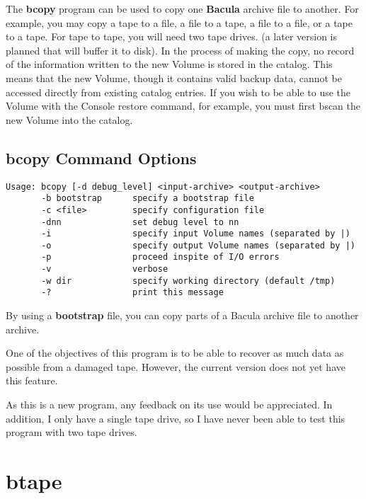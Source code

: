 The {\bf bcopy} program can be used to copy one {\bf Bacula} archive file to
another. For example, you may copy a tape to a file, a file to a tape, a file
to a file, or a tape to a tape. For tape to tape, you will need two tape
drives. (a later version is planned that will buffer it to disk). In the
process of making the copy, no record of the information written to the new
Volume is stored in the catalog. This means that the new Volume, though it
contains valid backup data, cannot be accessed directly from existing catalog
entries. If you wish to be able to use the Volume with the Console restore
command, for example, you must first bscan the new Volume into the catalog.

\subsection{bcopy Command Options}

\footnotesize
\begin{verbatim}
Usage: bcopy [-d debug_level] <input-archive> <output-archive>
       -b bootstrap      specify a bootstrap file
       -c <file>         specify configuration file
       -dnn              set debug level to nn
       -i                specify input Volume names (separated by |)
       -o                specify output Volume names (separated by |)
       -p                proceed inspite of I/O errors
       -v                verbose
       -w dir            specify working directory (default /tmp)
       -?                print this message
\end{verbatim}
\normalsize

By using a {\bf bootstrap} file, you can copy parts of a Bacula archive file
to another archive.

One of the objectives of this program is to be able to recover as much data as
possible from a damaged tape. However, the current version does not yet have
this feature.

As this is a new program, any feedback on its use would be appreciated. In
addition, I only have a single tape drive, so I have never been able to test
this program with two tape drives.

\section{btape}
\label{btape}

